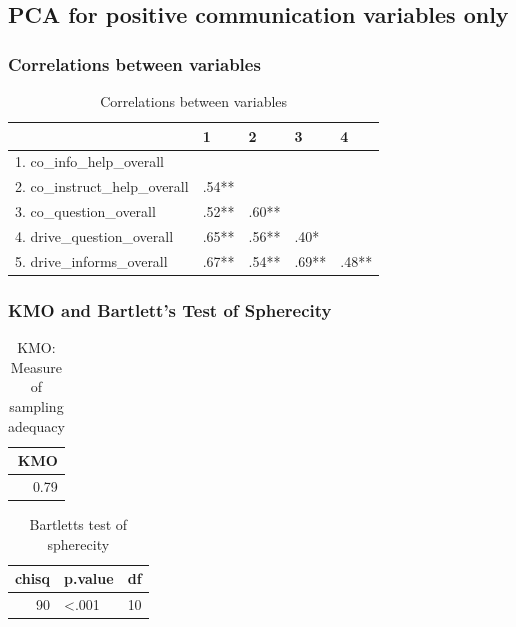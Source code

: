 \documentclass[]{article}
\begin{document}
\hypertarget{pca-for-positive-communication-variables-only}{%
\subsection{PCA for positive communication variables
only}\label{pca-for-positive-communication-variables-only}}

\hypertarget{correlations-between-variables-1}{%
\subsubsection{Correlations between
variables}\label{correlations-between-variables-1}}

\begin{table}[H]

\caption{\label{tab:unnamed-chunk-8}Correlations between variables}
\centering
\fontsize{6}{8}\selectfont
\begin{tabular}[t]{lllll}
\toprule
  & 1 & 2 & 3 & 4\\
\midrule
1. co\_info\_help\_overall &  &  &  & \\
2. co\_instruct\_help\_overall & .54** &  &  & \\
3. co\_question\_overall & .52** & .60** &  & \\
4. drive\_question\_overall & .65** & .56** & .40* & \\
5. drive\_informs\_overall & .67** & .54** & .69** & .48**\\
\bottomrule
\end{tabular}
\end{table}

\hypertarget{kmo-and-bartletts-test-of-spherecity-1}{%
\subsubsection{KMO and Bartlett's Test of
Spherecity}\label{kmo-and-bartletts-test-of-spherecity-1}}

\begin{table}[H]

\caption{\label{tab:unnamed-chunk-9}KMO: Measure of sampling adequacy}
\centering
\fontsize{6}{8}\selectfont
\begin{tabular}[t]{r}
\toprule
KMO\\
\midrule
0.79\\
\bottomrule
\end{tabular}
\end{table}

\begin{table}[H]

\caption{\label{tab:unnamed-chunk-9}Bartletts test of spherecity}
\centering
\fontsize{6}{8}\selectfont
\begin{tabular}[t]{rlr}
\toprule
chisq & p.value & df\\
\midrule
90 & <.001 & 10\\
\bottomrule
\end{tabular}
\end{table}
\end{document}
